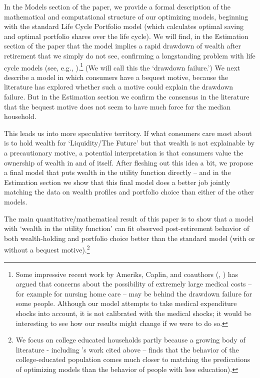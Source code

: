 \documentclass{article}
\begin{document}
In the Models section of the paper, we provide a formal description of the mathematical and computational structure of our optimizing models, beginning with the standard Life Cycle Portfolio model (which calculates optimal saving and optimal portfolio shares over the life cycle).  We will find, in the Estimation section of the paper that the model implies a rapid drawdown of wealth after retirement that we simply do not see, confirming a longstanding problem with life cycle models (see, e.g., \cite{hurd1987savings}).\footnote{Some impressive recent work by Ameriks, Caplin, and coauthors (\cite{ameriks2011joy}, \cite{Ameriks2020jpe}) has argued that concerns about the possibility of extremely large medical costs -- for example for nursing home care -- may be behind the drawdown failure for some people. Although our model attempts to take medical expenditure shocks into account, it is not calibrated with the \cite{Ameriks2020jpe} medical shocks; it would be interesting to see how our results might change if we were to do so.}  (We will call this the `drawdown failure.') We next describe a model in which consumers have a bequest motive, because the literature has explored whether such a motive could explain the drawdown failure.  But in the Estimation section we confirm the consensus in the literature that the bequest motive does not seem to have much force for the median household.

This leads us into more speculative territory.  If what consumers care most about is to hold wealth for `Liquidity/The Future' but that wealth is not explainable by a precautionary motive, a potential interpretation is that consumers value the ownership of wealth in and of itself.  After fleshing out this idea a bit, we propose a final model that puts wealth in the utility function directly -- and in the Estimation section we show that this final model does a better job jointly matching the data on wealth profiles and portfolio choice than either of the other models.

The main quantitative/mathematical result of this paper is to show that a model with `wealth in the utility function' can fit observed post-retirement behavior of both wealth-holding and portfolio choice better than the standard model (with or without a bequest motive).\footnote{We focus on college educated households partly because a growing body of literature - including \cite{velasquez-giraldoJMP}'s work cited above -- finds that the behavior of the college-educated population comes much closer to matching the predications of optimizing models than the behavior of people with less education).}
\end{document}
